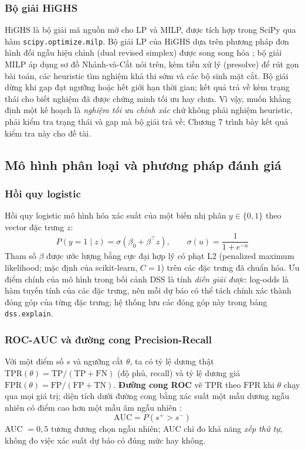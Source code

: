 \subsubsection*{Bộ giải HiGHS}
HiGHS là bộ giải mã nguồn mở cho LP và MILP, được tích hợp trong SciPy qua hàm \texttt{scipy.\allowbreak optimize.\allowbreak milp}. Bộ giải LP của HiGHS dựa trên phương pháp đơn hình đối ngẫu hiệu chỉnh (dual revised simplex) được song song hóa \cite{huangfu2018}; bộ giải MILP áp dụng sơ đồ Nhánh-và-Cắt nói trên, kèm tiền xử lý (presolve) để rút gọn bài toán, các heuristic tìm nghiệm khả thi sớm và các bộ sinh mặt cắt. Bộ giải dừng khi gap đạt ngưỡng hoặc hết giới hạn thời gian; kết quả trả về kèm trạng thái cho biết nghiệm đã được chứng minh tối ưu hay chưa. Vì vậy, muốn khẳng định một kế hoạch là \emph{nghiệm tối ưu chính xác} chứ không phải nghiệm heuristic, phải kiểm tra trạng thái và gap mà bộ giải trả về; Chương 7 trình bày kết quả kiểm tra này cho đề tài.

\subsection{Mô hình phân loại và phương pháp đánh giá}
\subsubsection*{Hồi quy logistic}
Hồi quy logistic \cite{hosmer2013} mô hình hóa xác suất của một biến nhị phân $y \in \{0,1\}$ theo vector đặc trưng $z$:
\begin{equation}
P(y = 1 \mid z) = \sigma(\beta_0 + \beta^\top z), \qquad \sigma(u) = \frac{1}{1 + e^{-u}}
\end{equation}
Tham số $\beta$ được ước lượng bằng cực đại hợp lý có phạt L2 (penalized maximum likelihood; mặc định của scikit-learn, $C = 1$) trên các đặc trưng đã chuẩn hóa. Ưu điểm chính của mô hình trong bối cảnh DSS là tính \emph{diễn giải được}: log-odds là hàm tuyến tính của các đặc trưng, nên mỗi dự báo có thể tách chính xác thành đóng góp của từng đặc trưng; hệ thống lưu các đóng góp này trong bảng \texttt{dss.explain}.

\subsubsection*{ROC-AUC và đường cong Precision-Recall}
Với một điểm số $s$ và ngưỡng cắt $\theta$, ta có tỷ lệ dương thật $\text{TPR}(\theta) = \text{TP}/(\text{TP} + \text{FN})$ (độ phủ, recall) và tỷ lệ dương giả $\text{FPR}(\theta) = \text{FP}/(\text{FP} + \text{TN})$. \textbf{Đường cong ROC} vẽ $\text{TPR}$ theo $\text{FPR}$ khi $\theta$ chạy qua mọi giá trị; diện tích dưới đường cong bằng xác suất một mẫu dương ngẫu nhiên có điểm cao hơn một mẫu âm ngẫu nhiên \cite{fawcett2006}:
\begin{equation}
\text{AUC} = P(s^{+} > s^{-})
\end{equation}
AUC $= 0{,}5$ tương đương chọn ngẫu nhiên; AUC chỉ đo khả năng \emph{xếp thứ tự}, không đo việc xác suất dự báo có đúng mức hay không.

